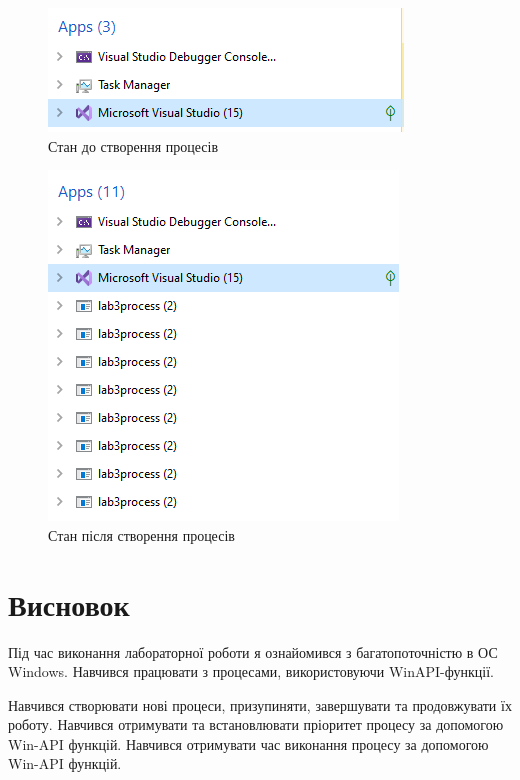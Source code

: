 \documentclass{article}
\begin{document}
\begin{normalsize}
	\begin{figure}[H]
		\centering
		\includegraphics[scale=0.7]{before}
		\caption{Стан до створення процесів}
	\end{figure}
	
	\begin{figure}[H]
		\centering
		\includegraphics[scale=0.7]{after}
		\caption{Стан після створення процесів}
	\end{figure}
	
	\section*{Висновок}
	Під час виконання лабораторної роботи я ознайомився з багатопоточністю в ОС Windows. Навчився працювати з процесами, використовуючи WinAPI-функції. 
	
	Навчився створювати нові процеси, призупиняти, завершувати та продовжувати їх роботу.
	Навчився отримувати та встановлювати пріоритет процесу за допомогою Win-API функцій.
	Навчився отримувати час виконання процесу за допомогою Win-API функцій.
	
	 
\end{normalsize}
\end{document}
